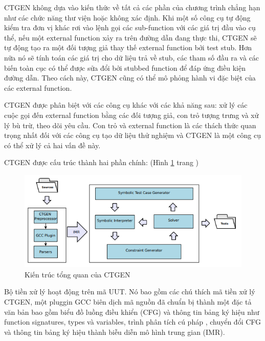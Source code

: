 \documentclass[12pt,a4paper]{report}
\begin{document}
\indent CTGEN không dựa vào kiến thức về tất cả các phần của chương trình chẳng hạn như các chức năng thư viện hoặc không xác định. Khi một số công cụ tự động kiểm tra đơn vị khác rơi vào lệnh gọi các sub-function với các giá trị đầu vào cụ thể, nếu một external function xảy ra trên đường dẫn đang thực thi, CTGEN sẽ tự động tạo ra một đối tượng giả thay thế external function bởi test stub. Hơn nữa nó sẽ tính toán các giá trị cho dữ liệu trả về stub, các tham số đầu ra và các biến toàn cục có thể được sửa đổi bởi stubbed function để đáp ứng điều kiện đường dẫn. Theo cách này, CTGEN cũng có thể mô phỏng hành vi đặc biệt của các external function.

\indent CTGEN được phân biệt với các công cụ khác với các khả năng sau: xử lý các cuộc gọi đến external function bằng các đối tượng giả, con trỏ tượng trưng và xử lý bù trừ, theo dõi yêu cầu. Con trỏ và external function là các thách thức quan trọng nhất đối với các công cụ tạo dữ liệu thử nghiệm và CTGEN là một công cụ có thể xử lý cả hai vấn đề này.

\indent CTGEN được cấu trúc thành hai phần chính: (Hình \ref{refhinh5} trang \pageref{refhinh5})

\begin{figure}[ht]
\begin{center}
\includegraphics[scale=0.8]{hinhanh/hinh5}
\end{center}
\caption{Kiến trúc tổng quan của CTGEN}
\label{refhinh5}
\end{figure}

\indent Bộ tiền xử lý hoạt động trên mã UUT. Nó bao gồm các chú thích mã tiền xử lý CTGEN, một pluggin GCC biên dịch mã nguồn đã chuẩn bị thành một đặc tả văn bản bao gồm biểu đồ luồng điều khiển (CFG) và thông tin bảng ký hiệu như function signatures, types và variables, trình phân tích cú pháp , chuyển đổi CFG và thông tin bảng ký hiệu thành biễu diễn mô hình trung gian (IMR).
\end{document}
